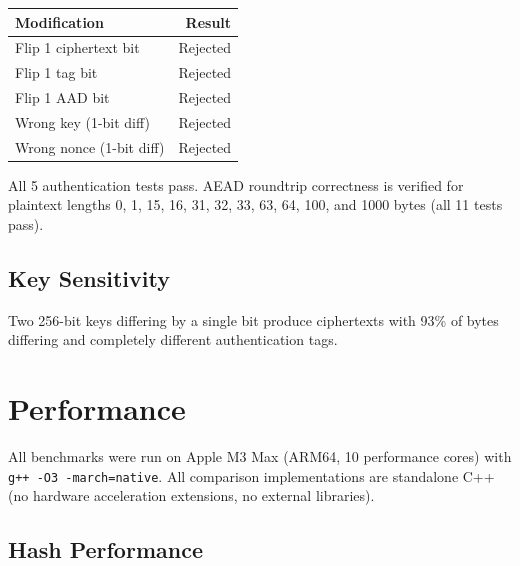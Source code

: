 \documentclass[11pt,a4paper]{article}
\newcommand{\toprule}{\hline}
\newcommand{\midrule}{\hline}
\newcommand{\bottomrule}{\hline}
\begin{document}
\begin{center}
\begin{tabular}{|l|r|}
\toprule
\textbf{Modification} & \textbf{Result} \\
\midrule
Flip 1 ciphertext bit & Rejected \\
Flip 1 tag bit         & Rejected \\
Flip 1 AAD bit         & Rejected \\
Wrong key (1-bit diff) & Rejected \\
Wrong nonce (1-bit diff) & Rejected \\
\bottomrule
\end{tabular}
\end{center}

All 5 authentication tests pass. AEAD roundtrip correctness is verified
for plaintext lengths 0, 1, 15, 16, 31, 32, 33, 63, 64, 100, and 1000
bytes (all 11 tests pass).

\subsection{Key Sensitivity}

Two 256-bit keys differing by a single bit produce ciphertexts with 93\%
of bytes differing and completely different authentication tags.

\section{Performance}
\label{sec:perf}

All benchmarks were run on Apple M3 Max (ARM64, 10 performance cores)
with \texttt{g++ -O3 -march=native}. All comparison implementations are
standalone C++ (no hardware acceleration extensions, no external
libraries).

\subsection{Hash Performance}
\end{document}
